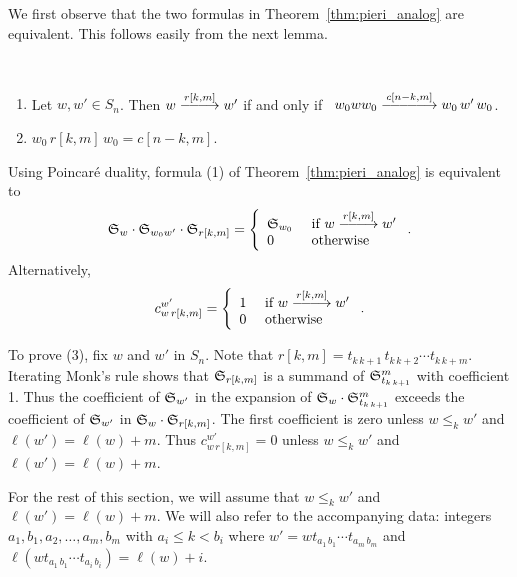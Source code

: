 We first observe that the two formulas in 
Theorem~\ref{thm:pieri_analog} are equivalent.
This follows easily from the next lemma.

\begin{lemma}\mbox{ }

\begin{enumerate}
\item
Let $w, w' \in S_n$.
Then 
$w \rkm w'$
if and only if \ 
$w_0ww_0 
\stackrel{c[n-k,m]}{\relbar\joinrel\lllra} 
w_0\,w'\,w_0$.
\item $w_0\, r[k,m]\, w_0 = c[n-k,m]$.
\end{enumerate}
\end{lemma}

Using Poincar\'e duality, formula (1) of Theorem~\ref{thm:pieri_analog}
is equivalent to 
$$
{\frak S}_{w} \cdot {\frak S}_{w_0w'}
\cdot {\frak S}_{r[k,m]} = 
\left\{
\begin{array}{ll}{\frak S}_{w_0}&\mbox{ if }
w  \rkm  w'\\
0 & \mbox{ otherwise} \end{array}\right. . %
$$
Alternatively, 
\begin{equation} \label{eq:structure_constants}
c_{w\,r[k,m]}^{w'} = \left\{
\begin{array}{ll} 1&\mbox{ if }
w  \rkm  w'\\
0 & \mbox{ otherwise} \end{array}\right. . %
\end{equation}

To prove (3), fix $w$ and $w'$ in $S_n$.
Note that
$r[k,m] = t_{k\,k+1}\, t_{k\,k+2}\cdots t_{k\,k+m}$.
Iterating Monk's rule  shows that ${\frak S}_{r[k,m]}$ is a summand of
${\frak S}_{t_{k\,k+1}}^m$ with coefficient 1.
Thus the coefficient of ${\frak S}_{w'}$ in the expansion of
${\frak S}_w \cdot {\frak S}_{t_{k\,k+1}}^m$  exceeds the 
coefficient of ${\frak S}_{w'}$ in ${\frak S}_w \cdot {\frak S}_{r[k,m]}$.
The first coefficient is zero unless 
$w\leq_k w'$ and $\ell(w') = \ell(w) +m$.
Thus $c_{w\,r[k,m]}^{w'} = 0$ unless 
$w\leq_k w'$ and $\ell(w') = \ell(w) +m$.
\smallskip


For the rest of this section, we will assume that $w\leq_k w'$ and 
$\ell(w') = \ell(w) +m$.
We will also refer to the accompanying data:
integers $a_1,b_1,a_2,\ldots,a_m,b_m$ with $a_i\leq k <b_i$ where
$w' = wt_{a_1\,b_1}\cdots t_{a_m\,b_m}$ and 
$\ell(wt_{a_1\,b_1}\cdots t_{a_i\,b_i}) = \ell(w) +i$.
\medskip

